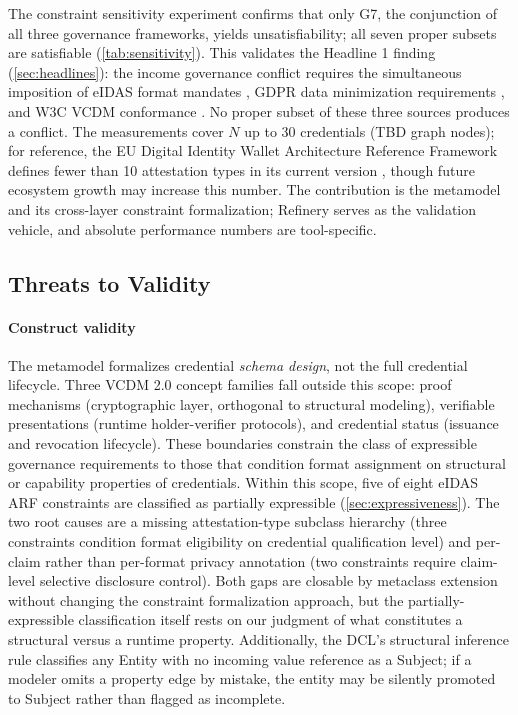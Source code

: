 The constraint sensitivity experiment confirms that only G7, the conjunction of all three governance frameworks, yields unsatisfiability; all seven proper subsets are satisfiable (\autoref{tab:sensitivity}). This validates the Headline 1 finding (\autoref{sec:headlines}): the income governance conflict requires the simultaneous imposition of eIDAS format mandates \citep{noauthor_eu-digital-identity-walleteudi-doc-architecture-and-reference-framework_2026}, GDPR data minimization requirements \citep{gdpr}, and W3C VCDM conformance \citep{manu_verifiable_2025}. No proper subset of these three sources produces a conflict. The measurements cover \(N\) up to 30 credentials (TBD graph nodes); for reference, the EU Digital Identity Wallet Architecture Reference Framework defines fewer than 10 attestation types in its current version \citep{noauthor_eu-digital-identity-walleteudi-doc-architecture-and-reference-framework_2026}, though future ecosystem growth may increase this number. The contribution is the metamodel and its cross-layer constraint formalization; Refinery serves as the validation vehicle, and absolute performance numbers are tool-specific.

\subsection{Threats to Validity}\label{threats-to-validity}

\label{sec:threats}

\paragraph{Construct validity}\label{construct-validity}

The metamodel formalizes credential \emph{schema design}, not the full credential lifecycle. Three VCDM 2.0 concept families fall outside this scope: proof mechanisms (cryptographic layer, orthogonal to structural modeling), verifiable presentations (runtime holder-verifier protocols), and credential status (issuance and revocation lifecycle). These boundaries constrain the class of expressible governance requirements to those that condition format assignment on structural or capability properties of credentials. Within this scope, five of eight eIDAS ARF constraints are classified as partially expressible (\autoref{sec:expressiveness}). The two root causes are a missing attestation-type subclass hierarchy (three constraints condition format eligibility on credential qualification level) and per-claim rather than per-format privacy annotation (two constraints require claim-level selective disclosure control). Both gaps are closable by metaclass extension without changing the constraint formalization approach, but the partially-expressible classification itself rests on our judgment of what constitutes a structural versus a runtime property. Additionally, the DCL's structural inference rule classifies any Entity with no incoming value reference as a Subject; if a modeler omits a property edge by mistake, the entity may be silently promoted to Subject rather than flagged as incomplete.

